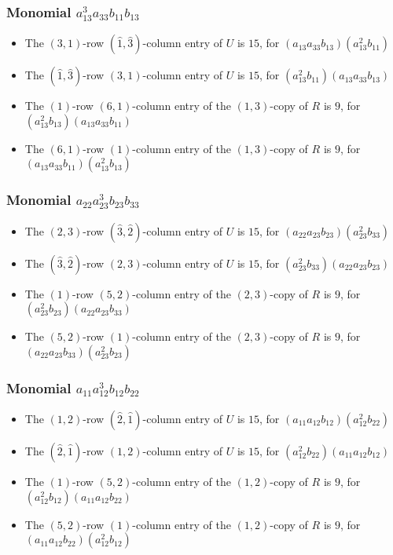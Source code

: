 \documentclass{article}
\begin{document}
\subsubsection{Monomial $ a_{13}^{3} a_{33} b_{11} b_{13} $}

\begin{itemize}
\item The $ \left(3, 1\right) $-row $ (\hat{1}, \hat{3}) $-column entry of $U$ is $ 15 $, for $( a_{13} a_{33} b_{13} )( a_{13}^{2} b_{11} )$ 
\item The $(\hat{1}, \hat{3})$-row $ \left(3, 1\right) $-column entry of $U$ is $ 15 $, for $( a_{13}^{2} b_{11} )( a_{13} a_{33} b_{13} )$ 
\item The $(1)$-row $(6, 1)$-column entry of the $ \left(1, 3\right) $-copy of $R$ is $ 9 $, for $( a_{13}^{2} b_{13} )( a_{13} a_{33} b_{11} )$ 
\item The $(6, 1)$-row $(1)$-column entry of the $ \left(1, 3\right) $-copy of $R$ is $ 9 $, for $( a_{13} a_{33} b_{11} )( a_{13}^{2} b_{13} )$ 
\end{itemize}
\subsubsection{Monomial $ a_{22} a_{23}^{3} b_{23} b_{33} $}

\begin{itemize}
\item The $ \left(2, 3\right) $-row $ (\hat{3}, \hat{2}) $-column entry of $U$ is $ 15 $, for $( a_{22} a_{23} b_{23} )( a_{23}^{2} b_{33} )$ 
\item The $(\hat{3}, \hat{2})$-row $ \left(2, 3\right) $-column entry of $U$ is $ 15 $, for $( a_{23}^{2} b_{33} )( a_{22} a_{23} b_{23} )$ 
\item The $(1)$-row $(5, 2)$-column entry of the $ \left(2, 3\right) $-copy of $R$ is $ 9 $, for $( a_{23}^{2} b_{23} )( a_{22} a_{23} b_{33} )$ 
\item The $(5, 2)$-row $(1)$-column entry of the $ \left(2, 3\right) $-copy of $R$ is $ 9 $, for $( a_{22} a_{23} b_{33} )( a_{23}^{2} b_{23} )$ 
\end{itemize}
\subsubsection{Monomial $ a_{11} a_{12}^{3} b_{12} b_{22} $}

\begin{itemize}
\item The $ \left(1, 2\right) $-row $ (\hat{2}, \hat{1}) $-column entry of $U$ is $ 15 $, for $( a_{11} a_{12} b_{12} )( a_{12}^{2} b_{22} )$ 
\item The $(\hat{2}, \hat{1})$-row $ \left(1, 2\right) $-column entry of $U$ is $ 15 $, for $( a_{12}^{2} b_{22} )( a_{11} a_{12} b_{12} )$ 
\item The $(1)$-row $(5, 2)$-column entry of the $ \left(1, 2\right) $-copy of $R$ is $ 9 $, for $( a_{12}^{2} b_{12} )( a_{11} a_{12} b_{22} )$ 
\item The $(5, 2)$-row $(1)$-column entry of the $ \left(1, 2\right) $-copy of $R$ is $ 9 $, for $( a_{11} a_{12} b_{22} )( a_{12}^{2} b_{12} )$ 
\end{itemize}
\end{document}
